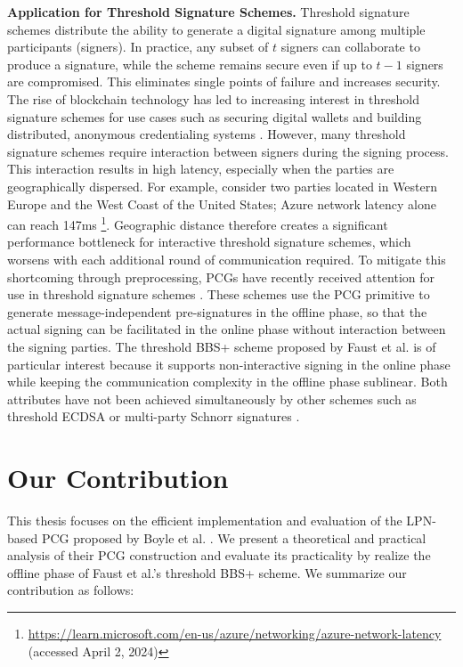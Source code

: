 \textbf{Application for Threshold Signature Schemes.}  Threshold signature schemes \cite{desmedt1987society, desmedt1992threshold} distribute the ability to generate a digital signature among multiple participants (signers). In practice, any subset of $t$ signers can collaborate to produce a signature, while the scheme remains secure even if up to $t - 1$ signers are compromised. This eliminates single points of failure and increases security. The rise of blockchain technology has led to increasing interest in threshold signature schemes for use cases such as securing digital wallets \cite{gennaro2016threshold} and building distributed, anonymous credentialing systems \cite{garman2013decentralized}. However, many threshold signature schemes require interaction between signers during the signing process. This interaction results in high latency, especially when the parties are geographically dispersed. For example, consider two parties located in Western Europe and the West Coast of the United States; Azure network latency alone can reach 147ms \footnote{\url{https://learn.microsoft.com/en-us/azure/networking/azure-network-latency} (accessed April 2, 2024)}. Geographic distance therefore creates a significant performance bottleneck for interactive threshold signature schemes, which worsens with each additional round of communication required. To mitigate this shortcoming through preprocessing, PCGs have recently received attention for use in threshold signature schemes \cite{abram2022low, cryptoeprint:2023/1076}. These schemes use the PCG primitive to generate message-independent pre-signatures in the offline phase, so that the actual signing can be facilitated in the online phase without interaction between the signing parties. The threshold BBS+ scheme proposed by Faust et al. \cite{cryptoeprint:2023/1076} is of particular interest because it supports non-interactive signing in the online phase while keeping the communication complexity in the offline phase sublinear. Both attributes have not been achieved simultaneously by other schemes such as threshold ECDSA \cite{abram2022low} or multi-party Schnorr signatures \cite{kondi2023two}. 

\section{Our Contribution}
This thesis focuses on the efficient implementation and evaluation of the LPN-based PCG proposed by Boyle et al. \cite{boyle2020efficient}. We present a theoretical and practical analysis of their PCG construction and evaluate its practicality by realize the offline phase of Faust et al.'s threshold BBS+ scheme. We summarize our contribution as follows:

